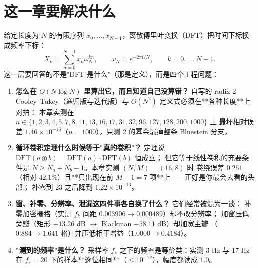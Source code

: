 % 


\section{这一章要解决什么}

给定长度为 $N$ 的有限序列 $x_0,\dots,x_{N-1}$，离散傅里叶变换（DFT）把时间下标换成频率下标：
\[
X_k=\sum_{n=0}^{N-1}x_n\omega_N^{kn},\qquad \omega_N=e^{-2\pi i/N},\qquad k=0,\dots,N-1 .
\]
这一层要回答的不是"DFT 是什么"（那是定义），而是四个工程问题：

\begin{enumerate}
  \item \textbf{怎么在 $O(N\log N)$ 里算出它，而且知道自己没算错？} 自写的 radix-2
        Cooley--Tukey（递归版与迭代版）与 $O(N^2)$ 定义式必须在**各种长度**上对拍：
        本章实测在 $n\in\{1,2,3,4,5,7,8,11,13,16,17,31,32,96,127,128,200,1000\}$ 上
        最坏相对误差 $1.46\times10^{-13}$（$n=1000$）。只测 2 的幂会漏掉整条 Bluestein 分支。
  \item \textbf{循环卷积定理什么时候等于"真的卷积"？} 定理说
        $\mathrm{DFT}(a\circledast b)=\mathrm{DFT}(a)\cdot\mathrm{DFT}(b)$ 恒成立；
        但它等于线性卷积的充要条件是 $N\ge N_a+N_b-1$。本章实测 $(N,M)=(16,8)$ 时
        卷绕误差 $0.251$（相对 $42.1\%$）且**只出现在前 $M-1=7$ 项**上——正好是你最会去看的头部；
        补零到 $23$ 之后降到 $1.22\times10^{-16}$。
  \item \textbf{窗、补零、分辨率、泄漏这四件事各自换了什么？} 它们经常被混为一谈：
        补零加密栅格（实测 $f_k$ 间距 $0.003906\to0.000489$）却不改分辨率；
        加窗压低旁瓣（矩形 $-13.26$ dB $\to$ Blackman $-58.11$ dB）却加宽主瓣
        （$0.884\to1.641$ 格）并压低相干增益（$1.0000\to0.4184$）。
  \item \textbf{"测到的频率"是什么？} 采样率 $f_s$ 之下的频率是等价类：实测 $3$ Hz 与 $17$ Hz
        在 $f_s=20$ 下的样本**逐位相同**（$\le10^{-12}$），幅度都读成 $1.0$。
\end{enumerate}

